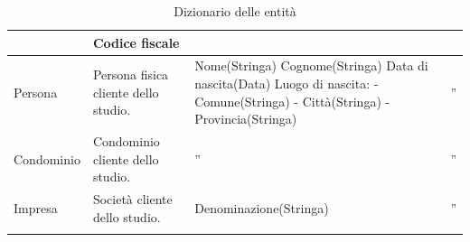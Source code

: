 \documentclass{elegantbook}
\begin{document}
\begin{longtable}{|p{2cm}|p{4.6cm}|p{6.2cm}|p{3.2cm}|}
		& Codice fiscale \\
            \hline
            Persona 
		& Persona fisica cliente dello studio. 
		& Nome(Stringa) 
		\newline Cognome(Stringa) 
		\newline Data di nascita(Data) 
		\newline Luogo di nascita: 
		\newline - Comune(Stringa) 
		\newline - Città(Stringa) 
		\newline - Provincia(Stringa) 
		& ''\\
            \hline
            Condominio 
		& Condominio cliente dello studio. 
		& ''
		& ''\\
            \hline
            Impresa 
		& Società cliente dello studio. 
		& Denominazione(Stringa) 
		& ''\\
            \hline
            \caption{Dizionario delle entità}
	\end{longtable}
	\newpage
\end{document}

